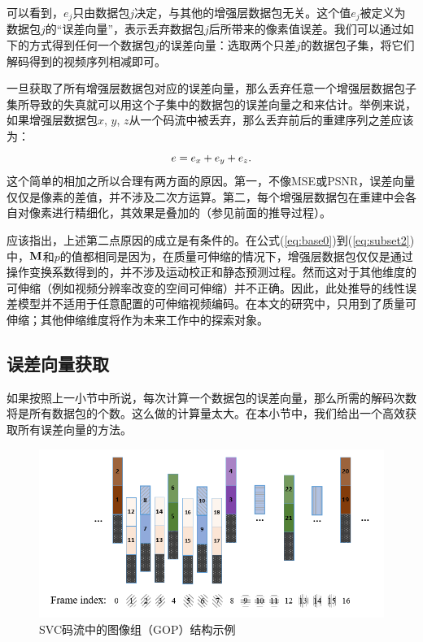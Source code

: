 可以看到，$e_j$只由数据包$j$决定，与其他的增强层数据包无关。这个值$e_j$被定义为数据包$j$的“误差向量”，表示丢弃数据包$j$后所带来的像素值误差。我们可以通过如下的方式得到任何一个数据包$j$的误差向量：选取两个只差$j$的数据包子集，将它们解码得到的视频序列相减即可。

一旦获取了所有增强层数据包对应的误差向量，那么丢弃任意一个增强层数据包子集所导致的失真就可以用这个子集中的数据包的误差向量之和来估计。举例来说，如果增强层数据包$x$, $y$, $z$从一个码流中被丢弃，那么丢弃前后的重建序列之差应该为：
\begin{equation}
\vspace{10pt}
e = e_x + e_y + e_z.
\end{equation}
这个简单的相加之所以合理有两方面的原因。第一，不像MSE或PSNR，误差向量仅仅是像素的差值，并不涉及二次方运算。第二，每个增强层数据包在重建中会各自对像素进行精细化，其效果是叠加的（参见前面的推导过程）。

应该指出，上述第二点原因的成立是有条件的。在公式(\ref{eq:base0})到(\ref{eq:subset2})中，${\rm\bf M}$和$p$的值都相同是因为，在质量可伸缩的情况下，增强层数据包仅仅是通过操作变换系数得到的，并不涉及运动校正和静态预测过程。然而这对于其他维度的可伸缩（例如视频分辨率改变的空间可伸缩）并不正确。因此，此处推导的线性误差模型并不适用于任意配置的可伸缩视频编码。在本文的研究中，只用到了质量可伸缩；其他伸缩维度将作为未来工作中的探索对象。

\subsection{误差向量获取}

如果按照上一小节中所说，每次计算一个数据包的误差向量，那么所需的解码次数将是所有数据包的个数。这么做的计算量太大。在本小节中，我们给出一个高效获取所有误差向量的方法。

\begin{figure}[h]
\centering
\vspace{10pt}
\includegraphics[width = 1.0\linewidth]{figures/GOP-Structure.png}
\caption{SVC码流中的图像组（GOP）结构示例 \label{fig:GOP_Structure}}
\end{figure}

